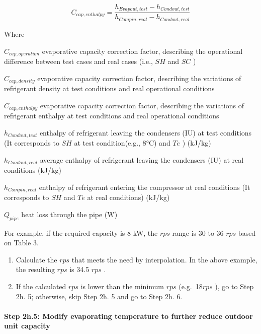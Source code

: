 \begin{equation}
C_{cap,enthalpy} = \frac{h_{Evapout,test}-h_{Condout,test}}{h_{Compin,real}-h_{Condout,real}}
\end{equation}

Where

\(C_{cap,operation}\) evaporative capacity correction factor, describing the operational difference between test cases and real cases (i.e., \(SH\) and \(SC\) )

\(C_{cap,density}\) evaporative capacity correction factor, describing the variations of refrigerant density at test conditions and real operational conditions

\(C_{cap,enthalpy}\) evaporative capacity correction factor, describing the variations of refrigerant enthalpy at test conditions and real operational conditions

\(h_{Condout,test}\) enthalpy of refrigerant leaving the condensers (IU) at test conditions (It corresponds to \(SH\) at test condition(e.g., 8°C) and \(Te\) ) (kJ/kg)

\(h_{Condout,real}\) average enthalpy of refrigerant leaving the condensers (IU) at real conditions (kJ/kg)

\(h_{Compin,real}\) enthalpy of refrigerant entering the compressor at real conditions (It corresponds to \(SH\) and \(Te\) at real conditions) (kJ/kg)

\(Q_{pipe}\) heat loss through the pipe (W)

For example, if the required capacity is 8 kW, the \(rps\) range is 30 to 36 \(rps\) based on Table 3.

\begin{enumerate}
\def\labelenumi{\alph{enumi}.}
\setcounter{enumi}{2}
\item
  Calculate the \(rps\) that meets the need by interpolation. In the above example, the resulting \(rps\) is 34.5 \(rps\) .
\item
  If the calculated \(rps\) is lower than the minimum \(rps\) (e.g.~18\(rps\) ), go to Step 2h. 5; otherwise, skip Step 2h. 5 and go to Step 2h. 6.
\end{enumerate}

\paragraph{Step 2h.5: Modify evaporating temperature to further reduce outdoor unit capacity}\label{step-2h.5-modify-evaporating-temperature-to-further-reduce-outdoor-unit-capacity}

